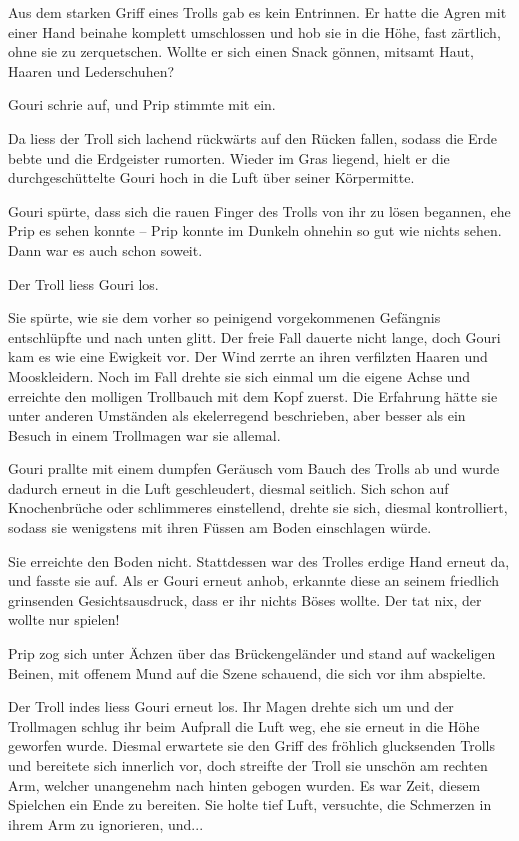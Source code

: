Aus dem starken Griff eines Trolls gab es kein Entrinnen. Er hatte die Agren mit einer Hand beinahe komplett umschlossen und hob sie in die Höhe, fast zärtlich, ohne sie zu zerquetschen. Wollte er sich einen Snack gönnen, mitsamt Haut, Haaren und Lederschuhen?

Gouri schrie auf, und Prip stimmte mit ein.

Da liess der Troll sich lachend rückwärts auf den Rücken fallen, sodass die Erde bebte und die Erdgeister rumorten. Wieder im Gras liegend, hielt er die durchgeschüttelte Gouri hoch in die Luft über seiner Körpermitte.

Gouri spürte, dass sich die rauen Finger des Trolls von ihr zu lösen begannen, ehe Prip es sehen konnte – Prip konnte im Dunkeln ohnehin so gut wie nichts sehen. Dann war es auch schon soweit.

Der Troll liess Gouri los.

Sie spürte, wie sie dem vorher so peinigend vorgekommenen Gefängnis entschlüpfte und nach unten glitt. Der freie Fall dauerte nicht lange, doch Gouri kam es wie eine Ewigkeit vor. Der Wind zerrte an ihren verfilzten Haaren und Mooskleidern. Noch im Fall drehte sie sich einmal um die eigene Achse und erreichte den molligen Trollbauch mit dem Kopf zuerst. Die Erfahrung hätte sie unter anderen Umständen als ekelerregend beschrieben, aber besser als ein Besuch in einem Trollmagen war sie allemal.

Gouri prallte mit einem dumpfen Geräusch vom Bauch des Trolls ab und wurde dadurch erneut in die Luft geschleudert, diesmal seitlich. Sich schon auf Knochenbrüche oder schlimmeres einstellend, drehte sie sich, diesmal kontrolliert, sodass sie wenigstens mit ihren Füssen am Boden einschlagen würde.

Sie erreichte den Boden nicht. Stattdessen war des Trolles erdige Hand erneut da, und fasste sie auf. Als er Gouri erneut anhob, erkannte diese an seinem friedlich grinsenden Gesichtsausdruck, dass er ihr nichts Böses wollte. Der tat nix, der wollte nur spielen!

Prip zog sich unter Ächzen über das Brückengeländer und stand auf wackeligen Beinen, mit offenem Mund auf die Szene schauend, die sich vor ihm abspielte.

Der Troll indes liess Gouri erneut los. Ihr Magen drehte sich um und der Trollmagen schlug ihr beim Aufprall die Luft weg, ehe sie erneut in die Höhe geworfen wurde. Diesmal erwartete sie den Griff des fröhlich glucksenden Trolls und bereitete sich innerlich vor, doch streifte der Troll sie unschön am rechten Arm, welcher unangenehm nach hinten gebogen wurden. Es war Zeit, diesem Spielchen ein Ende zu bereiten. Sie holte tief Luft, versuchte, die Schmerzen in ihrem Arm zu ignorieren, und...

